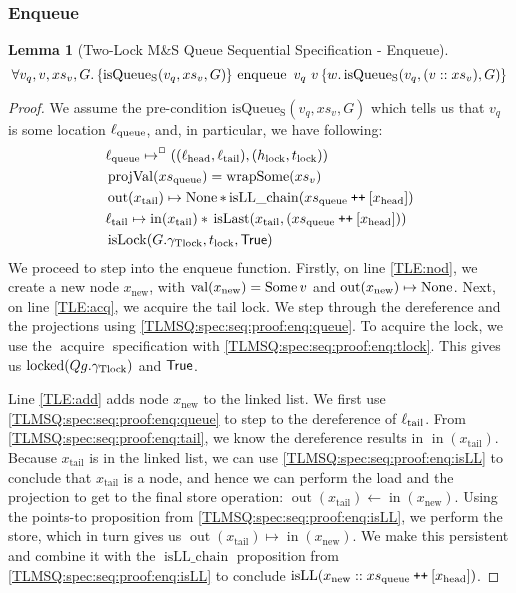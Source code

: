 \documentclass[a4paper, 10pt]{report}
\theoremstyle{definition}
\newtheorem{lemma}[theorem]{Lemma}
\newcommand{\isLock}{\operatorname{isLock}}
\newcommand{\locked}{\operatorname{locked}}
\newcommand{\acquire}{\operatorname{acquire}}
\newcommand{\enqueue}{\operatorname{enqueue}}
\newcommand{\msq}{M\&S Queue}
\newcommand{\tlmsq}{Two-Lock \msq{}}
\newcommand{\isqueueseq}{\operatorname{isQueue_{S}}}
\newcommand{\vq}{v_q}
\newcommand{\xsqueue}{xs_{\mathrm{queue}}}
\newcommand{\isLLchain}{\operatorname{isLL\_chain}}
\newcommand{\isLL}{\operatorname{isLL}}
\newcommand{\projval}{\operatorname{projVal}}
\newcommand{\wrapsome}{\operatorname{wrapSome}}
\newcommand{\isLast}{\operatorname{isLast}}
\newcommand{\locN}[1]{\loc_{\mathrm{#1}}}
\newcommand{\lochead}{\locN{head}}
\newcommand{\loctail}{\locN{tail}}
\newcommand{\locqueue}{\locN{queue}}
\newcommand{\nIn}[1]{\operatorname{in}(#1)}
\newcommand{\nVal}[1]{\operatorname{val}(#1)}
\newcommand{\nOut}[1]{\operatorname{out}(#1)}
\newcommand{\node}{x}
\newcommand{\nodeN}[1]{\node_{\mathrm{#1}}}
\newcommand{\nodehead}{\nodeN{head}}
\newcommand{\nodetail}{\nodeN{tail}}
\newcommand{\nodenew}{\nodeN{new}}
\newcommand{\absvalue}{\val}
\newcommand{\absvalueList}{xs_v}
\newcommand{\Hlock}{h_{\mathrm{lock}}}
\newcommand{\Tlock}{t_{\mathrm{lock}}}
\newcommand{\Qg}{G}
\newcommand{\gtlock}{\gname_{\mathrm{Tlock}}}
\newcommand\catenate{\mathbin{\text{\ttfamily\upshape ++}}}
\newcommand{\seqspecenqHT}[4]{\hoare{\isqueueseq(#1, #3, #4)}{\enqueue \ #1 \ #2}{\valB . \isqueueseq(#1, (#2 :: #3), #4)}}
\newcommand{\seqspecenqGen}[4]{\All #1, #2, #3, #4. \seqspecenqHT{#1}{#2}{#3}{#4}}
\newcommand{\seqspecenq}{\seqspecenqGen{\vq}{\absvalue}{\absvalueList}{\Qg}}
\begin{document}
\subsubsection{Enqueue}
\begin{lemma}[\tlmsq{} Sequential Specification - Enqueue]\label{TLMSQ:spec:seq:enqueue}
  \begin{equation*}
    \seqspecenq
  \end{equation*}
\end{lemma}
\begin{proof}
We assume the pre-condition $\isqueueseq(\vq, \absvalueList, \Qg)$ which tells us that $\vq$ is some location $\locqueue$, and, in particular, we have following:
\begin{align}
  &\locqueue \mapsto^{\persistently} ((\lochead, \loctail), (\Hlock, \Tlock))\label{TLMSQ:spec:seq:proof:enq:queue}\\
  &\projval(\xsqueue) = \wrapsome(\absvalueList)\label{TLMSQ:spec:seq:proof:enq:rel}\\
  &\nOut{\nodetail} \mapsto \None \star{} \isLLchain (\xsqueue \catenate [\nodehead])\label{TLMSQ:spec:seq:proof:enq:isLL}\\
  &\loctail \mapsto \nIn{\nodetail} \star{} \isLast(\nodetail, (\xsqueue \catenate [\nodehead]))\label{TLMSQ:spec:seq:proof:enq:tail}\\
  &\isLock(\Qg.\gtlock, \Tlock, \TRUE)\label{TLMSQ:spec:seq:proof:enq:tlock}
\end{align}
We proceed to step into the enqueue function. Firstly, on line \ref{TLE:nod}, we create a new node $\nodenew$, with $\nVal{\nodenew} = \Some \absvalue$ and $\nOut{\nodenew} \mapsto \None$. Next, on line \ref{TLE:acq}, we acquire the tail lock. We step through the dereference and the projections using \ref{TLMSQ:spec:seq:proof:enq:queue}. To acquire the lock, we use the $\acquire$ specification with \ref{TLMSQ:spec:seq:proof:enq:tlock}. This gives us $\locked(Qg.\gtlock)$ and $\textsf{True}$.

Line \ref{TLE:add} adds node $\nodenew$ to the linked list. We first use \ref{TLMSQ:spec:seq:proof:enq:queue} to step to the dereference of $\loctail$. From \ref{TLMSQ:spec:seq:proof:enq:tail}, we know the dereference results in $\nIn{\nodetail}$. Because $\nodetail$ is in the linked list, we can use \ref{TLMSQ:spec:seq:proof:enq:isLL} to conclude that $\nodetail$ is a node, and hence we can perform the load and the projection to get to the final store operation: $\nOut{\nodetail} \gets \nIn{\nodenew}$. Using the points-to proposition from \ref{TLMSQ:spec:seq:proof:enq:isLL}, we perform the store, which in turn gives us $\nOut{\nodetail} \mapsto \nIn{\nodenew}$. We make this persistent and combine it with the $\isLLchain$ proposition from \ref{TLMSQ:spec:seq:proof:enq:isLL} to conclude $\isLL(\nodenew :: \xsqueue \catenate [\nodehead])$.


\end{proof}
\end{document}
